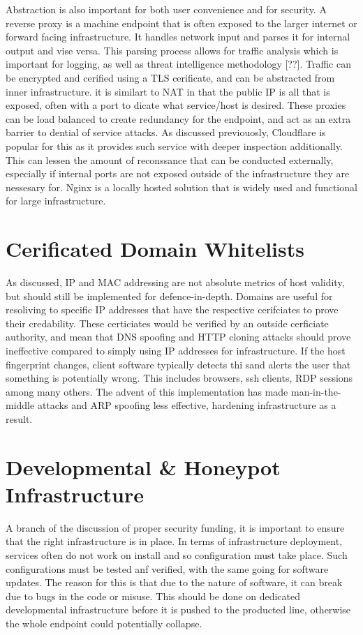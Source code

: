 Abstraction is also important for both user convenience and for security. A reverse proxy is a machine endpoint that is often exposed to the larger internet or forward facing infrastructure. It handles network input and parses it for internal output and vise versa. This parsing process allows for traffic analysis which is important for logging, as well as threat intelligence methodology [??].
Traffic can be encrypted and cerified using a TLS cerificate, and can be abstracted from inner infrastructure. it is similart to NAT in that the public IP is all that is exposed, often with a port to dicate what service/host is desired. These proxies can be load balanced to create redundancy for the endpoint, and act as an extra barrier to dential of service attacks. As discussed previouosly, Cloudflare is popular for this as it provides such service with deeper inspection additionally.
This can lessen the amount of reconssance that can be conducted externally, especially if internal ports are not exposed outside of the infrastructure they are nessesary for. Nginx is a locally hosted solution that is widely used and functional for large infrastructure.


\section{Cerificated Domain Whitelists}
As discussed, IP and MAC addressing are not absolute metrics of host validity, but should still be implemented for defence-in-depth. Domains are useful for resoliving to specific IP addresses that have the respective cerifciates to prove their credability. These certiciates would be verified by an outside cerficiate authority, and mean that DNS spoofing and HTTP cloning attacks should prove ineffective compared to simply using IP addresses for infrastructure. If the host fingerprint changes, 
client software typically detects thi sand alerts the user that something is potentially wrong. This includes browsers, ssh clients, RDP sessions among many others. The advent of this implementation has made man-in-the-middle attacks and ARP spoofing less effective, hardening infrastructure as a result.

\section{Developmental \& Honeypot Infrastructure}
A branch of the discussion of proper security funding, it is important to ensure that the right infrastructure is in place. In terms of infrastructure deployment, services often do not work on install and so configuration must take place. Such configurations must be tested anf verified, with the same going for software updates. The reason for this is that due to the nature of software, it can break due to bugs in the code or misuse. 
This should be done on dedicated developmental infrastructure before it is pushed to the producted line, otherwise the whole endpoint could potentially collapse.

